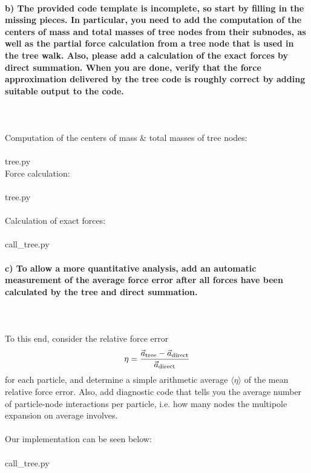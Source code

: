 \paragraph{b)
    The provided code template is incomplete, so start by filling 
    in the missing pieces. In particular, you need to add the 
    computation of the centers of mass and total masses of tree 
    nodes from their subnodes, as well as the partial force 
    calculation from a tree node that is used in the tree walk. 
    Also, please add a calculation of the exact forces by 
    direct summation. When you are done, verify that the force 
    approximation delivered by the tree code is roughly correct 
    by adding suitable output to the code.
} \ \\
    \\
    Computation of the centers of mass \& total masses of tree nodes: \\
    \\
    tree.py
     \ \\
    \newpage \noindent
    Force calculation: \\
    \\
    tree.py
     \ \\
    \\
    Calculation of exact forces: \\
    \\
    call\_tree.py
    

\newpage
\paragraph{c)
    To allow a more quantitative analysis, add an automatic 
    measurement of the average force error after all forces 
    have been calculated by the tree and direct summation.
} \ \\ 
    \\
    To this end, consider the relative force error
    \begin{equation}
        \eta
        =\frac{\vec{a}_\textnormal{tree}-
        \vec{a}_\textnormal{direct}}{\vec{a}_\textnormal{direct}}
    \end{equation}
    for each particle, and determine a simple arithmetic average 
    $\langle\eta\rangle$ of the mean relative force error. Also, 
    add diagnostic code that tells you the average number of 
    particle-node interactions per particle, i.e. how many nodes 
    the multipole expansion on average involves. \ \\
    \\
    Our implementation can be seen below: \\
    \\
    call\_tree.py
    


